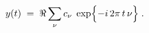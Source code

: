\begin{equation}
y(t) \; = \; \Re \sum _\nu c_\nu \; \exp \Bigl\{ -i \, 2\pi \, t \, \nu 
\Bigr\} \; . 
\label{fo3}
\end{equation}

